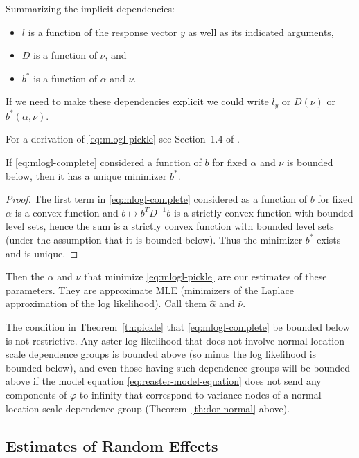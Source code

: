 Summarizing the implicit dependencies:
\begin{itemize}
\item $l$ is a function of the response vector $y$ as well as its indicated
    arguments,
\item $D$ is a function of $\nu$, and
\item $b^*$ is a function of $\alpha$ and $\nu$.
\end{itemize}
If we need to make these dependencies explicit we could write $l_y$ or
$D(\nu)$ or $b^*(\alpha, \nu)$.

For a derivation of \eqref{eq:mlogl-pickle} see Section~1.4 of
\citet{reaster-tr}.

\begin{theorem} \label{th:pickle}
If \eqref{eq:mlogl-complete} considered a function of $b$ for
fixed $\alpha$ and $\nu$ is bounded below,
then it has a unique minimizer $b^*$.
\end{theorem}
\begin{proof}
The first term in \eqref{eq:mlogl-complete} considered as a function of $b$
for fixed $\alpha$ is a convex function and $b \mapsto b^T D^{-1} b$ is a
strictly convex function with bounded level sets,
hence the sum is a strictly convex function with bounded level sets
(under the assumption that it is bounded below).
Thus the minimizer $b^*$ exists and is unique.
\end{proof}

Then the $\alpha$ and $\nu$ that minimize \eqref{eq:mlogl-pickle} are
our estimates of these parameters.  They are approximate MLE (minimizers
of the Laplace approximation of the log likelihood).  Call them $\hat{\alpha}$
and $\hat{\nu}$.

The condition in Theorem~\ref{th:pickle} that \eqref{eq:mlogl-complete} be
bounded below is not restrictive.
Any aster log likelihood that does not involve
normal location-scale dependence groups is bounded above
(so minus the log likelihood is bounded below), and even those
having such dependence groups will be bounded above if the model equation
\eqref{eq:reaster-model-equation} does not send any components of $\varphi$
to infinity that correspond to variance nodes of a normal-location-scale
dependence group (Theorem~\ref{th:dor-normal} above).

\subsection{Estimates of Random Effects}
\label{sec:bee-hat}

